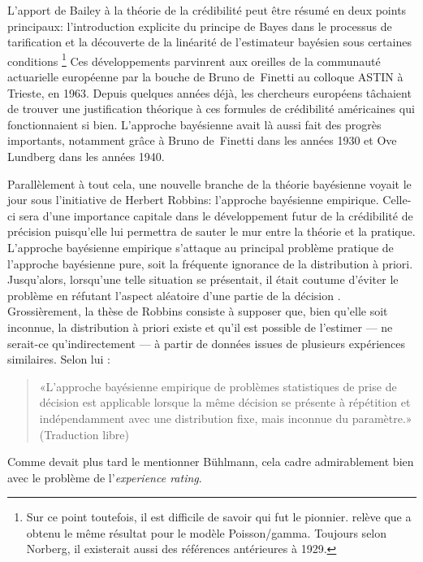 L'apport de Bailey à la théorie de la crédibilité peut être résumé en
deux points principaux: l'introduction explicite du principe de Bayes
dans le processus de tarification et la découverte de la linéarité de
l'estimateur bayésien sous certaines conditions%
\footnote{Sur ce point toutefois, il est difficile de savoir qui fut
  le pionnier. \citet{Norberg:credibility:1979} relève que
  \citet{Keffer:1929} a obtenu le même résultat pour le modèle
  Poisson/gamma. Toujours selon Norberg, il existerait aussi des
  références antérieures à 1929.} %
Ces développements parvinrent aux oreilles de la communauté
actuarielle européenne par la bouche de Bruno de~Finetti au colloque
ASTIN à Trieste, en 1963. Depuis quelques années déjà, les
chercheurs européens tâchaient de trouver une justification théorique
à ces formules de crédibilité américaines qui fonctionnaient si bien.
L'approche bayésienne avait là aussi fait des progrès importants,
notamment grâce à Bruno de~Finetti dans les années 1930 et Ove Lundberg
dans les années 1940.

Parallèlement à tout cela, une nouvelle branche de la théorie
bayésienne voyait le jour sous l'initiative de Herbert Robbins:
l'approche bayésienne empirique. Celle-ci sera d'une importance
capitale dans le développement futur de la crédibilité de précision
puisqu'elle lui permettra de sauter le mur entre la théorie et la
pratique. L'approche bayésienne empirique
\citep{Robbins:empiricalbayes:1955,Robbins:empiricalbayes:1964}
s'attaque au principal problème pratique de l'approche bayésienne
pure, soit la fréquente ignorance de la distribution à priori.
Jusqu'alors, lorsqu'une telle situation se présentait, il était
coutume d'éviter le problème en réfutant l'aspect aléatoire d'une
partie de la décision \citep{Neyman:1962}. Grossièrement, la thèse de
Robbins consiste à supposer que, bien qu'elle soit inconnue, la
distribution à priori existe et qu'il est possible de l'estimer --- ne
serait-ce qu'indirectement --- à partir de données issues de plusieurs
expériences similaires. Selon lui \citep{Robbins:empiricalbayes:1964}:
\begin{quote}
  «L'approche bayésienne empirique de problèmes statistiques de prise
  de décision est applicable lorsque la même décision se présente à
  répétition et indépendamment avec une distribution fixe, mais
  inconnue du paramètre.» (Traduction libre)
\end{quote}

Comme devait plus tard le mentionner Bühlmann, cela cadre
admirablement bien avec le problème de l'\emph{experience rating}.

